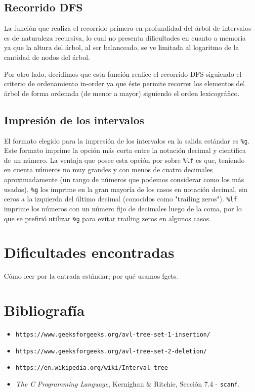\documentclass[11pt]{article}
\begin{document}
 \subsection{Recorrido DFS}
 
 La función que realiza el recorrido primero en profundidad del árbol de intervalos es de naturaleza recursiva, lo cual no presenta dificultades en cuanto a memoria ya que la altura del árbol, al ser balanceado, se ve limitada al logaritmo de la cantidad de nodos del árbol. \par

 Por otro lado, decidimos que esta función realice el recorrido DFS siguiendo el criterio de ordenamiento in-order ya que éste permite recorrer los elementos del árbol de forma ordenada (de menor a mayor) siguiendo el orden lexicográfico.\par
 
 \subsection{Impresión de los intervalos}
 
 El formato elegido para la impresión de los intervalos en la salida estándar es \verb|%g|. Este formato imprime la opción más corta entre la notación decimal y científica de un número.  La ventaja que posee esta opción por sobre \verb|%lf| es que, teniendo en cuenta números no muy grandes y con menos de cuatro decimales aproximadamente (un rango de números que podemos considerar como los más usados), \verb|%g| los imprime en la gran mayoría de los casos en notación decimal, sin ceros a la izquierda del último decimal (conocidos como "trailing zeros"). \verb|%lf| imprime los números con un número fijo de decimales luego de la coma, por lo que se prefirió utilizar \verb|%g| para evitar trailing zeros en algunos casos.
 
 \section{Dificultades encontradas}
 
 Cómo leer por la entrada estándar; por qué usamos fgets.
 
 
 
 \section{Bibliografía}
 \begin{itemize}
     \item \verb|https://www.geeksforgeeks.org/avl-tree-set-1-insertion/|
     \item \verb|https://www.geeksforgeeks.org/avl-tree-set-2-deletion/|
     \item \verb|https://en.wikipedia.org/wiki/Interval_tree|
     \item \textit{The C Programming Language}, Kernighan \& Ritchie, Sección 7.4 - \verb|scanf|.
 \end{itemize}
 
\end{document}
